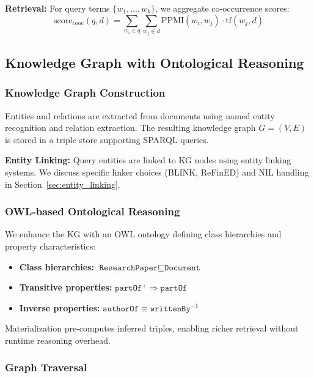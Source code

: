 \documentclass[11pt,a4paper]{article}
\begin{document}
\textbf{Retrieval:} For query terms $\{w_1, \ldots, w_k\}$, we aggregate co-occurrence scores:
\begin{equation}
\text{score}_{\text{cooc}}(q, d) = \sum_{w_i \in q} \sum_{w_j \in d} \text{PPMI}(w_i, w_j) \cdot \text{tf}(w_j, d)
\end{equation}

\subsection{Knowledge Graph with Ontological Reasoning}
\label{sec:kg_retrieval}

\subsubsection{Knowledge Graph Construction}

Entities and relations are extracted from documents using named entity recognition and relation extraction. The resulting knowledge graph $G = (V, E)$ is stored in a triple store supporting SPARQL queries.

\textbf{Entity Linking:} Query entities are linked to KG nodes using entity linking systems. We discuss specific linker choices (BLINK, ReFinED) and NIL handling in Section~\ref{sec:entity_linking}.

\subsubsection{OWL-based Ontological Reasoning}

We enhance the KG with an OWL ontology defining class hierarchies and property characteristics:
\begin{itemize}
    \item \textbf{Class hierarchies:} $\texttt{ResearchPaper} \sqsubseteq \texttt{Document}$
    \item \textbf{Transitive properties:} $\texttt{partOf}^+ \Rightarrow \texttt{partOf}$
    \item \textbf{Inverse properties:} $\texttt{authorOf} \equiv \texttt{writtenBy}^{-1}$
\end{itemize}

Materialization pre-computes inferred triples, enabling richer retrieval without runtime reasoning overhead.

\subsubsection{Graph Traversal}
\end{document}
